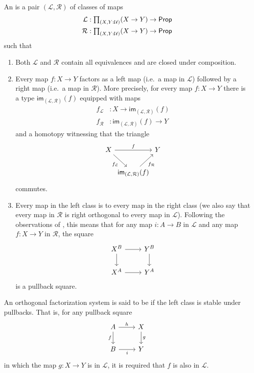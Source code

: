 \documentclass[9pt,twosided]{amsart}
\begin{document}
\begin{defn}
  An  is a pair $(\mathcal{L},\mathcal{R})$ of classes of maps
  \begin{align*}
    \mathcal{L} & : \prd{X,Y:\UU} (X \to Y) \to \mathsf{Prop} \\
    \mathcal{R} & : \prd{X,Y:\UU} (X \to Y) \to \mathsf{Prop} 
  \end{align*}
  such that
  \begin{enumerate}
  \item Both $\mathcal{L}$ and $\mathcal{R}$ contain all equivalences and are closed under composition.
  \item Every map $f:X\to Y$ factors as a left map (i.e.~a map in $\mathcal{L}$) followed by a right map (i.e.~a map in $\mathcal{R}$). More precisely, for every map $f:X\to Y$ there is a type $\mathsf{im}_{(\mathcal{L},\mathcal{R})}(f)$ equipped with maps
    \begin{align*}
      f_{\mathcal{L}} & :X\to \mathsf{im}_{(\mathcal{L},\mathcal{R})}(f)\\
      f_{\mathcal{R}} & :\mathsf{im}_{(\mathcal{L},\mathcal{R})}(f) \to Y
    \end{align*}
    and a homotopy witnessing that the triangle
    \begin{equation*}
      \begin{tikzcd}[column sep=0]
        X \arrow[rr,"f"] \arrow[dr,swap,"f_{\mathcal{L}}"] & & Y \\
        & \mathsf{im}_{(\mathcal{L},\mathcal{R})}(f) \arrow[ur,swap,"f_{\mathcal{R}}"]
      \end{tikzcd}
    \end{equation*}
    commutes.
  \item Every map in the left class is  to every map in the right class (we also say that every map in $\mathcal{R}$ is right orthogonal to every map in $\mathcal{L}$). Following the observations of \cite{AnelBiedermanFinsterJoyal}, this means that for any map $i:A \to B$ in $\mathcal{L}$ and any map $f:X \to Y$ in $\mathcal{R}$, the square
    \begin{equation*}
      \begin{tikzcd}
        X^B \arrow[r] \arrow[d] & Y^B \arrow[d] \\
        X^A \arrow[r] & Y^A
      \end{tikzcd}
    \end{equation*}
    is a pullback square.
  \end{enumerate}
  An orthogonal factorization system is said to be  if the left class is stable under pullbacks. That is, for any pullback square
  \begin{equation*}
    \begin{tikzcd}
      A \arrow[r,"h"] \arrow[d,swap,"f"] & X \arrow[d,"g"] \\
      B \arrow[r,swap,"i"] & Y
    \end{tikzcd}
  \end{equation*}
  in which the map $g:X \to Y$ is in $\mathcal{L}$, it is required that $f$ is also in $\mathcal{L}$.
\end{defn}
\end{document}
